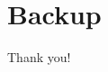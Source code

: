 \documentclass[usenames,dvipsnames]{beamer}
\theoremstyle{definition}
\begin{document}
\section{Backup}
\begin{frame}{}
\begin{center}
    \Large{Thank you!}
\end{center}
        
\end{frame}


\end{document}
